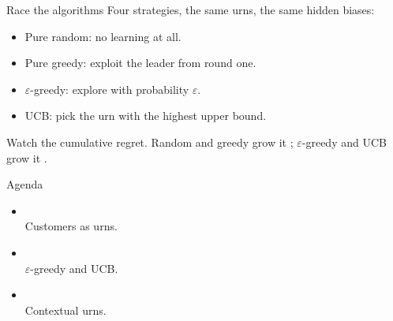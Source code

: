 \begin{frame}{Race the algorithms}
  Four strategies, the same urns, the same hidden biases:

  \smallskip
  \begin{itemize}
    \setlength{\itemsep}{0.3em}
    \item Pure random: no learning at all.
    \item Pure greedy: exploit the leader from round one.
    \item $\varepsilon$-greedy: explore with probability $\varepsilon$.
    \item UCB: pick the urn with the highest upper bound.
  \end{itemize}

  \smallskip
  Watch the cumulative regret.  Random and greedy grow it
  ; $\varepsilon$-greedy and UCB grow it
  .
\end{frame}


\begin{frame}{Agenda}
  \medskip
  \begin{itemize}
    \setlength{\itemsep}{1.0em}
    \item[\textbf{\textcolor{clusterLF}{1.}}]
           \\[1pt]
          {\scriptsize\color{mutedWarmGray}Customers as urns.}
    \item[\textbf{\textcolor{clusterDF}{2.}}]
           \\[1pt]
          {\scriptsize\color{mutedWarmGray}$\varepsilon$-greedy and UCB.}
    \item[\textbf{\textcolor{clusterDN}{3.}}]
           \\[1pt]
          {\scriptsize\color{mutedWarmGray}Contextual urns.}
  \end{itemize}
\end{frame}

